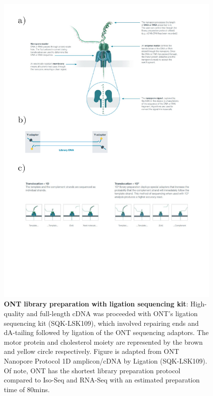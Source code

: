 \begin{figure}[]
	\centering
	\includegraphics[page=3,trim={0 16cm 0 0 },clip, scale = 0.7]{Figures/ProjectDevelopment_FiguresONT}
	\captionsetup{width=0.95\textwidth}
	\caption[ONT library preparation with ligation sequencing kit]%
	{\textbf{ONT library preparation with ligation sequencing kit}: High-quality and full-length cDNA was proceeded with ONT's ligation sequencing kit (SQK-LSK109), which involved repairing ends and dA-tailing followed by ligation of the ONT sequencing adaptors. The motor protein and cholesterol moiety are represented by the brown and yellow circle respectively. Figure is adapted from ONT Nanopore Protocol 1D amplicon/cDNA by Ligation (SQK-LSK109). Of note, ONT has the shortest library preparation protocol compared to Iso-Seq and RNA-Seq with an estimated preparation time of 80mins.}
	\label{fig:ONT_Protocol}
\end{figure}

